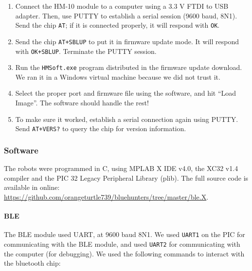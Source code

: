 \documentclass[]{article}
\let\oldparagraph\paragraph
\renewcommand{\paragraph}[1]{\oldparagraph{#1}\mbox{}}
\begin{document}
\begin{enumerate}
\item
  Connect the HM-10 module to a computer using a 3.3 V FTDI to USB
  adapter. Then, use PUTTY to establish a serial session (9600 baud,
  8N1). Send the chip \texttt{AT}; if it is connected properly, it will
  respond with \texttt{OK}.
\item
  Send the chip \texttt{AT+SBLUP} to put it in firmware update mode. It
  will respond with \texttt{OK+SBLUP}. Terminate the PUTTY session.
\item
  Run the \texttt{HMSoft.exe} program distributed in the firmware update
  download. We ran it in a Windows virtual machine because we did not
  trust it.
\item
  Select the proper port and firmware file using the software, and hit
  ``Load Image''. The software should handle the rest!
\item
  To make sure it worked, establish a serial connection again using
  PUTTY. Send \texttt{AT+VERS?} to query the chip for version
  information.
\end{enumerate}

\subsubsection{Software}

The robots were programmed in C, using MPLAB X IDE v4.0, the XC32 v1.4
compiler and the PIC 32 Legacy Peripheral Library (plib).
The full source code is available in online: \url{https://github.com/orangeturtle739/bluehunters/tree/master/ble.X}.

\paragraph{BLE}

The BLE module used UART, at 9600 baud 8N1. We used \texttt{UART1} on
the PIC for communicating with the BLE module, and used \texttt{UART2}
for communicating with the computer (for debugging).
We used the following commands to interact with the bluetooth chip:
\end{document}

